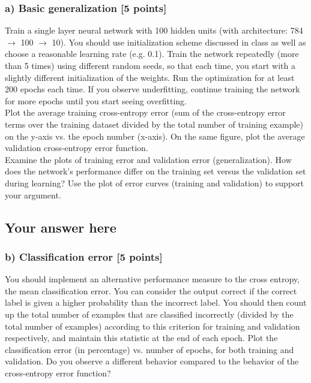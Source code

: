 \documentclass{article}
\begin{document}
\subsubsection*{a) Basic generalization [5 points]}
Train a single layer neural network with 100 hidden units
(with architecture: 784 $\rightarrow$ 100 $\rightarrow$  10).  
You should
use initialization scheme discussed in class as well as choose a reasonable 
learning rate (e.g. 0.1). Train the network 
repeatedly (more than 5 times) using different random seeds, 
so that each time, you start with a slightly different initialization of 
the weights. 
Run the optimization for at least 200 epochs each time.
If you observe underfitting, continue training the network
for more epochs until you start seeing overfitting.
\\
  
Plot the average training cross-entropy error (sum of 
the cross-entropy error terms over the training dataset  divided by the total number 
of training example) on the y-axis vs. the epoch number (x-axis). 
On the same figure, plot the average validation cross-entropy error function.
\\
 
Examine the plots of training error and validation error (generalization).
How does the network's performance differ on the training set versus the validation set
during learning? Use the plot of error curves (training and validation) to support your argument.


\subsection*{Your answer here}

\subsubsection*{b) Classification error [5 points]}

You should implement an alternative performance measure to the cross entropy, the mean
classification error. You can
consider the output correct if the correct label is given a higher probability
than the incorrect label. You should then count up the total number of
examples that are classified incorrectly (divided by the total number of examples) 
according to this criterion for
training and validation respectively, and maintain this statistic at the end of
each epoch. Plot the classification error (in percentage)  vs. number of epochs, for both
training and validation.
Do you observe a different behavior compared to the behavior of the cross-entropy 
error function? 
\end{document}
